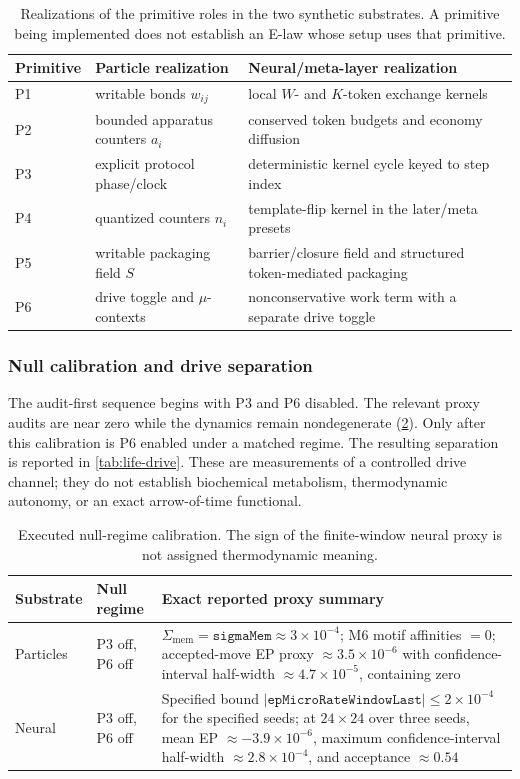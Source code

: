 \begin{table}[htbp]
\centering
\small
\begin{tabularx}{\textwidth}{@{}lXX@{}}
\toprule
Primitive & Particle realization & Neural/meta-layer realization \\
\midrule
P1 & writable bonds $w_{ij}$ & local $W$- and $K$-token exchange kernels \\
P2 & bounded apparatus counters $a_i$ & conserved token budgets and economy
diffusion \\
P3 & explicit protocol phase/clock & deterministic kernel cycle keyed to
step index \\
P4 & quantized counters $n_i$ & template-flip kernel in the later/meta
presets \\
P5 & writable packaging field $S$ & barrier/closure field and structured
token-mediated packaging \\
P6 & drive toggle and $\mu$-contexts & nonconservative work term with a
separate drive toggle \\
\bottomrule
\end{tabularx}
\caption{Realizations of the primitive roles in the two synthetic substrates.  A
primitive being implemented does not establish an E-law whose setup uses
that primitive.}
\label{tab:life-primitive-map}
\end{table}

\subsubsection{Null calibration and drive separation}

The audit-first sequence begins with P3 and P6 disabled.  The relevant proxy
audits are near zero while the dynamics remain nondegenerate
(\cref{tab:life-null}).  Only after this calibration is P6 enabled under a
matched regime.  The resulting separation is reported in
\cref{tab:life-drive}.  These are measurements of a controlled drive channel;
they do not establish biochemical metabolism, thermodynamic autonomy, or an
exact arrow-of-time functional.

\begin{table}[htbp]
\centering
\small
\begin{tabularx}{\textwidth}{@{}llX@{}}
\toprule
Substrate & Null regime & Exact reported proxy summary \\
\midrule
Particles & P3 off, P6 off &
$\Sigma_{\mathrm{mem}}=\texttt{sigmaMem}\approx3\times10^{-4}$;
M6 motif affinities $=0$; accepted-move EP proxy
$\approx3.5\times10^{-6}$ with confidence-interval half-width
$\approx4.7\times10^{-5}$, containing zero \\
Neural & P3 off, P6 off &
Specified bound
$|\texttt{epMicroRateWindowLast}|\le2\times10^{-4}$ for the specified seeds;
at $24\times24$ over three seeds, mean EP
$\approx-3.9\times10^{-6}$, maximum confidence-interval half-width
$\approx2.8\times10^{-4}$, and acceptance $\approx0.54$ \\
\bottomrule
\end{tabularx}
\caption{Executed null-regime calibration.  The sign of the finite-window
neural proxy is not assigned thermodynamic meaning.}
\label{tab:life-null}
\end{table}


